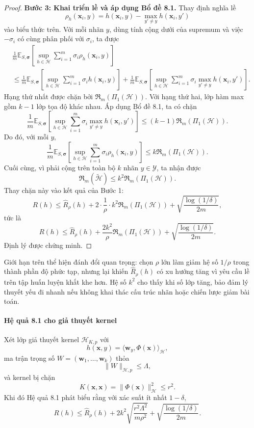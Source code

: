 \begin{proof}
\textbf{Bước 3: Khai triển lề và áp dụng Bổ đề 8.1.}
Thay định nghĩa lề
\[
  \rho_h(\bm{x}_i,y)=h(\bm{x}_i,y)-\max_{y'\neq y}h(\bm{x}_i,y')
\]
vào biểu thức trên. Với mỗi nhãn $y$, dùng tính cộng dưới của supremum và việc $-\sigma_i$ có cùng phân phối với $\sigma_i$, ta được
\begin{align*}
  &\frac{1}{m}\mathbb{E}_{S,\bm{\sigma}}
  \left[\sup_{h\in\mathcal{H}}\sum_{i=1}^{m}\sigma_i\rho_h(\bm{x}_i,y)\right]\\
  &\leq \frac{1}{m}\mathbb{E}_{S,\bm{\sigma}}
  \left[\sup_{h\in\mathcal{H}}\sum_{i=1}^{m}\sigma_i h(\bm{x}_i,y)\right]
  +\frac{1}{m}\mathbb{E}_{S,\bm{\sigma}}
  \left[\sup_{h\in\mathcal{H}}\sum_{i=1}^{m}\sigma_i\max_{y'\neq y}h(\bm{x}_i,y')\right].
\end{align*}
Hạng thứ nhất được chặn bởi $\mathfrak{R}_m(\Pi_1(\mathcal{H}))$. Với hạng thứ hai, lớp hàm max gồm $k-1$ lớp tọa độ khác nhau. Áp dụng Bổ đề 8.1, ta có chặn
\[
  \frac{1}{m}\mathbb{E}_{S,\bm{\sigma}}
  \left[\sup_{h\in\mathcal{H}}\sum_{i=1}^{m}\sigma_i\max_{y'\neq y}h(\bm{x}_i,y')\right]
  \leq (k-1)\mathfrak{R}_m(\Pi_1(\mathcal{H})).
\]
Do đó, với mỗi $y$,
\[
  \frac{1}{m}\mathbb{E}_{S,\bm{\sigma}}
  \left[\sup_{h\in\mathcal{H}}\sum_{i=1}^{m}\sigma_i\rho_h(\bm{x}_i,y)\right]
  \leq k\mathfrak{R}_m(\Pi_1(\mathcal{H})).
\]
Cuối cùng, vì phải cộng trên toàn bộ $k$ nhãn $y\in\mathcal{Y}$, ta nhận được
\[
  \mathfrak{R}_m(\widetilde{\mathcal{H}})
  \leq k^2\mathfrak{R}_m(\Pi_1(\mathcal{H})).
\]
Thay chặn này vào kết quả của Bước 1:
\[
  R(h)
  \leq \widehat{R}_\rho(h)
  +2\cdot\frac{1}{\rho}\cdot k^2\mathfrak{R}_m(\Pi_1(\mathcal{H}))
  +\sqrt{\frac{\log(1/\delta)}{2m}},
\]
tức là
\[
  R(h)\leq \widehat{R}_{\rho}(h)
  +\frac{2k^2}{\rho}\mathfrak{R}_m(\Pi_1(\mathcal{H}))
  +\sqrt{\frac{\log(1/\delta)}{2m}}.
\]
Định lý được chứng minh.
\end{proof}

Giới hạn trên thể hiện đánh đổi quan trọng: chọn $\rho$ lớn làm giảm hệ số $1/\rho$ trong thành phần độ phức tạp, nhưng lại khiến $\widehat{R}_\rho(h)$ có xu hướng tăng vì yêu cầu lề trên tập huấn luyện khắt khe hơn. Hệ số $k^2$ cho thấy khi số lớp tăng, bảo đảm lý thuyết yếu đi nhanh nếu không khai thác cấu trúc nhãn hoặc chiến lược giảm bài toán.

\paragraph{Hệ quả 8.1 cho giả thuyết kernel}

Xét lớp giả thuyết kernel $\mathcal{H}_{K,p}$ với
\[
  h(\bm{x},y)=\langle \bm{w}_y,\Phi(\bm{x})\rangle_{\mathcal{H}},
\]
ma trận trọng số $W=(\bm{w}_1,\ldots,\bm{w}_k)$ thỏa
\[
  \|W\|_{\mathcal{H},p}\leq \Lambda,
\]
và kernel bị chặn
\[
  K(\bm{x},\bm{x})=\|\Phi(\bm{x})\|_{\mathcal{H}}^2\leq r^2.
\]
Khi đó Hệ quả 8.1 phát biểu rằng với xác suất ít nhất $1-\delta$,
\[
  R(h)\leq \widehat{R}_\rho(h)
  +2k^2\sqrt{\frac{r^2\Lambda^2}{m\rho^2}}
  +\sqrt{\frac{\log(1/\delta)}{2m}}.
\]

